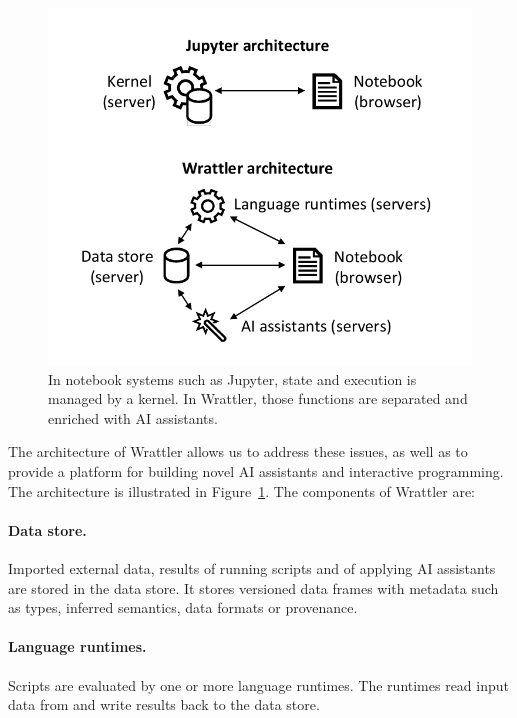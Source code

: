 \documentclass[sigplan,preprint,10pt]{acmart}\settopmatter{printfolios=true,printccs=false,printacmref=false}
\theoremstyle{plain}
\theoremstyle{definition}
\begin{document}
\begin{figure}
\vspace{-0.5em}
\includegraphics[scale=0.6]{diagram.pdf}
\vspace{-0.5em}
\caption{\small{In notebook systems such as Jupyter, state and execution is managed by a kernel. In
  Wrattler, those functions are separated and enriched with AI assistants.}}
\label{fig:arch}
\vspace{-0.5em}
\end{figure}


The architecture of Wrattler allows us to address these issues, as well as to provide a platform
for building novel AI assistants and interactive programming. The architecture is illustrated
in Figure~\ref{fig:arch}. The components of Wrattler are:
%
\paragraph{Data store.} Imported external data, results of running scripts and of 
applying AI assistants are stored in the data store. It stores versioned data frames with 
metadata such as types, inferred semantics, data formats or provenance.

\paragraph{Language runtimes.} Scripts are evaluated by one or more language runtimes.
The runtimes read input data from and write results back to the data store.
\end{document}
